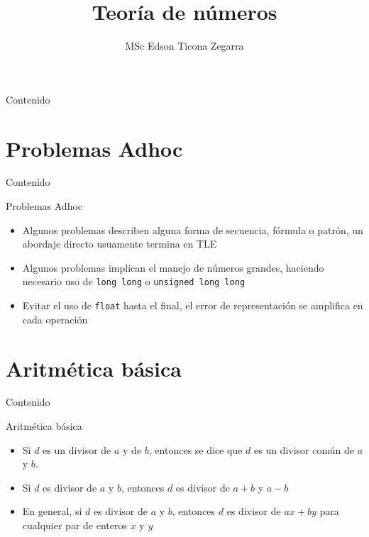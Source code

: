 \documentclass[]{beamer}
\title{Teor\'ia de n\'umeros}
\author{MSc Edson Ticona Zegarra}
\institute{Campamento de Programaci\'on}
\date{}
\begin{document}
\maketitle

\begin{frame}{Contenido}
\tableofcontents
\end{frame}

\section{Problemas Adhoc}
\begin{frame}{Contenido}
\tableofcontents[currentsection]
\end{frame}


\begin{frame}{Problemas Adhoc}
 \begin{itemize}
    \item Algunos problemas describen alguna forma de secuencia, f\'ormula o patr\'on, un abordaje directo usuamente termina en TLE
      \pause
    \item Algunos problemas implican el manejo de n\'umeros grandes, haciendo necesario uso de \texttt{long long} o \texttt{unsigned long long}
      \pause
    \item Evitar el uso de \texttt{float} hasta el final, el error de representaci\'on se amplifica en cada operaci\'on
  \end{itemize}
\end{frame}


\section{Aritm\'etica b\'asica}
\begin{frame}{Contenido}
\tableofcontents[currentsection]
\end{frame}

\begin{frame}{Aritm\'etica b\'asica}
 \begin{itemize}
    \item Si $d$ es un divisor de $a$ y de $b$, entonces se dice que $d$ es un divisor com\'un de $a$ y $b$.
      \pause
    \item Si $d$ es divisor de $a$ y $b$, entonces $d$ es divisor de $a+b$ y $a-b$
      \pause
    \item En general, si $d$ es divisor de $a$ y $b$, entonces $d$ es divisor de $ax+by$ para cualquier par de enteros $x$ y $y$
  \end{itemize}
\end{frame}
\end{document}
